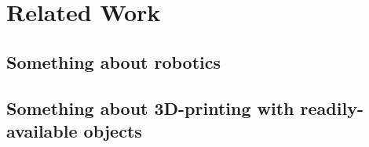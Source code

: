 \chapter{Related Work}\label{ch:relatedwork}
\section{Something about robotics}
\clearpage
\section{Something about 3D-printing with readily-available objects}
